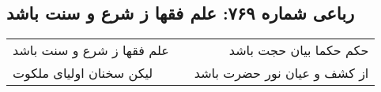 \begin{center}
\section*{رباعی شماره ۷۶۹: علم فقها ز شرع و سنت باشد}
\label{sec:0769}
\begin{longtable}{l p{0.5cm} r}
علم فقها ز شرع و سنت باشد
&&
حکم حکما بیان حجت باشد
\\
لیکن سخنان اولیای ملکوت
&&
از کشف و عیان نور حضرت باشد
\\
\end{longtable}
\end{center}
